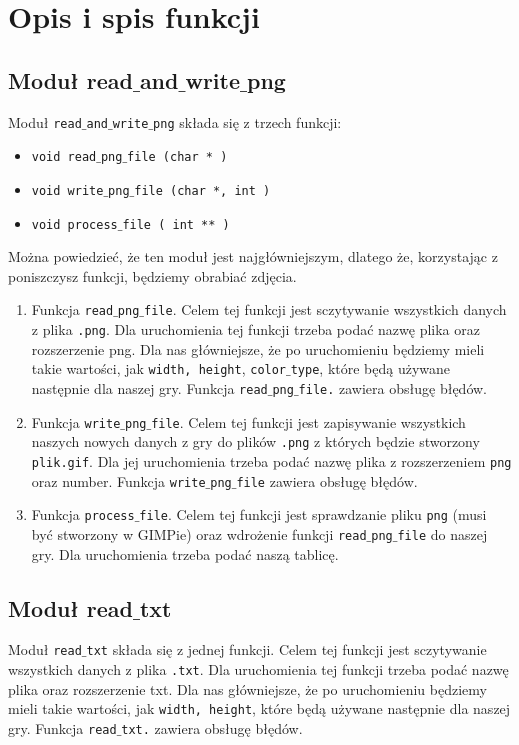 \documentclass[a4paper, 12pt]{article}
\begin{document}
	\section{Opis i spis funkcji}
		\subsection{Moduł read$\_$and$\_$write$\_$png} 
			\hspace*{1cm} Moduł \texttt{read$\_$and$\_$write$\_$png} składa się z trzech funkcji:
			\renewcommand{\labelitemi}{$\ast$}
		\begin{itemize}
			\item \texttt{void read$\_$png$\_$file (char * )}
			\item \texttt{void write$\_$png$\_$file (char *, int )}
			\item \texttt{void process$\_$file ( int ** )}
		\end{itemize}
			\hspace*{1cm} Można powiedzieć, że ten moduł jest najgłówniejszym, dlatego że, korzystając z poniszczysz funkcji, będziemy obrabiać zdjęcia.
		\begin{enumerate}
 			\item Funkcja \texttt{read$\_$png$\_$file}. Celem tej funkcji jest sczytywanie wszystkich danych z plika \texttt{.png}. Dla uruchomienia tej funkcji trzeba podać nazwę plika oraz rozszerzenie png. Dla nas główniejsze, że po uruchomieniu będziemy mieli takie wartości, jak \texttt{width, height}, \texttt{color$\_$type}, które będą używane następnie dla naszej gry. Funkcja \texttt{read$\_$png$\_$file.} zawiera obsługę błędów.
 			\item Funkcja \texttt{write$\_$png$\_$file}. Celem tej funkcji jest zapisywanie wszystkich naszych nowych danych z gry do plików \texttt{.png} z których będzie stworzony \texttt{plik.gif}. Dla jej uruchomienia trzeba podać nazwę plika z rozszerzeniem \texttt{png} oraz number. Funkcja \texttt{write$\_$png$\_$file} zawiera obsługę błędów.
 			\item Funkcja \texttt{process$\_$file}. Celem tej funkcji jest sprawdzanie pliku \texttt{png} (musi być stworzony w GIMPie) oraz wdrożenie funkcji \texttt{read$\_$png$\_$file} do naszej gry. Dla uruchomienia trzeba podać naszą tablicę.
 		\end{enumerate}


		\subsection{Moduł read$\_$txt} 
			\hspace*{1cm} Moduł \texttt{read$\_$txt} składa się z jednej funkcji. Celem tej funkcji jest sczytywanie wszystkich danych z plika \texttt{.txt}. Dla uruchomienia tej funkcji trzeba podać nazwę plika oraz rozszerzenie txt. Dla nas główniejsze, że po uruchomieniu będziemy mieli takie wartości, jak \texttt{width, height}, które będą używane następnie dla naszej gry. Funkcja \texttt{read$\_$txt.} zawiera obsługę błędów.
\end{document}
